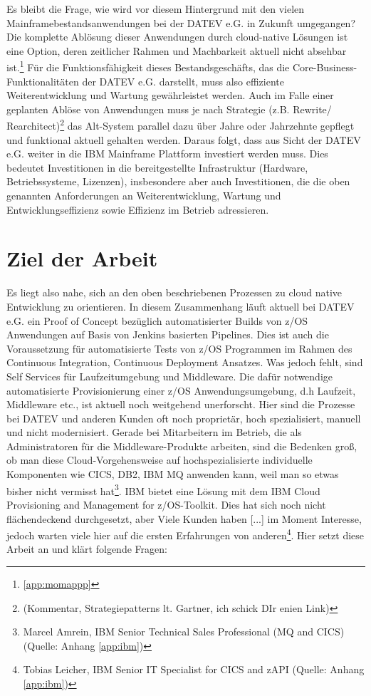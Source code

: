 Es bleibt die Frage, wie wird vor diesem Hintergrund mit den vielen Mainframebestandsanwendungen bei der DATEV e.G. in Zukunft umgegangen?
Die komplette Ablösung dieser Anwendungen durch cloud-native Lösungen ist eine Option, deren zeitlicher Rahmen und Machbarkeit aktuell nicht absehbar ist.\footnote{\ref{app:momappp} }
Für die Funktionsfähigkeit dieses Bestandsgeschäfts, das die Core-Business-Funktionalitäten der DATEV e.G. darstellt, muss also effiziente Weiterentwicklung und Wartung gewährleistet werden.
Auch im Falle einer geplanten Ablöse von Anwendungen muss je nach Strategie (z.B. \glqq Rewrite\grqq / \glqq Rearchitect\grqq)\footnote{(Kommentar, Strategiepatterns lt. Gartner, ich schick DIr enien Link)} das Alt-System parallel dazu über Jahre oder Jahrzehnte gepflegt und funktional aktuell gehalten werden.
Daraus folgt, dass aus Sicht der DATEV e.G. weiter in die IBM Mainframe Plattform investiert werden muss. 
Dies bedeutet Investitionen in die bereitgestellte Infrastruktur (Hardware, Betriebssysteme, Lizenzen), insbesondere aber auch Investitionen, die die oben genannten Anforderungen an Weiterentwicklung, Wartung und Entwicklungseffizienz sowie Effizienz im Betrieb adressieren.

\section{Ziel der Arbeit}\label{sec:ziel}
Es liegt also nahe, sich an den oben beschriebenen Prozessen zu cloud native Entwicklung zu orientieren. 
In diesem Zusammenhang läuft aktuell  bei DATEV e.G. ein Proof of Concept bezüglich automatisierter Builds von z/OS Anwendungen auf Basis von Jenkins basierten Pipelines. 
Dies ist auch die Voraussetzung für automatisierte Tests von z/OS Programmen im Rahmen des \glqq Continuous Integration, Continuous Deployment\grqq{} Ansatzes.
Was jedoch fehlt, sind \glqq Self Services\grqq{} für  Laufzeitumgebung und  Middleware.
Die dafür notwendige automatisierte Provisionierung einer z/OS Anwendungsumgebung, d.h Laufzeit, Middleware etc., ist aktuell noch weitgehend unerforscht. 
Hier sind die Prozesse bei DATEV und anderen Kunden oft noch proprietär, hoch spezialisiert,  manuell und nicht modernisiert. 
Gerade bei Mitarbeitern im Betrieb, die als Administratoren für die Middleware-Produkte arbeiten, sind die Bedenken groß, ob man diese Cloud-Vorgehensweise auf hochspezialisierte individuelle Komponenten wie CICS, DB2, IBM MQ anwenden kann, \glqq weil man so etwas bisher nicht vermisst hat\grqq\footnote{Marcel Amrein, IBM Senior Technical Sales Professional (MQ and CICS) (Quelle: Anhang \ref{app:ibm})}.
IBM bietet eine Lösung mit dem \glqq IBM Cloud Provisioning and Management for z/OS\grqq-Toolkit. 
Dies hat sich noch nicht flächendeckend durchgesetzt, aber \glqq Viele Kunden haben [...] im Moment Interesse, jedoch warten viele hier auf die ersten Erfahrungen von anderen\grqq\footnote{Tobias Leicher, IBM Senior IT Specialist for CICS and zAPI (Quelle: Anhang \ref{app:ibm})}.
Hier setzt diese Arbeit an und klärt folgende Fragen:

